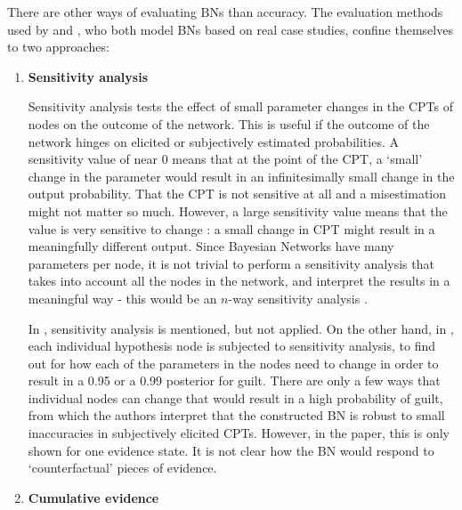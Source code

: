 \documentclass[12pt]{article}
\begin{document}
There are other ways of evaluating BNs than accuracy. The evaluation methods used by \citet{Fenton2019} and \citet{vlek2016}, who both model BNs based on real case studies, confine themselves to two approaches:

\begin{enumerate}

\item \textbf{Sensitivity analysis}

Sensitivity analysis tests the effect of small parameter changes in the CPTs of nodes on the outcome of the network. This is useful if the outcome of the network hinges on elicited or subjectively estimated probabilities. A sensitivity value of near 0 means that at the point of the CPT, a `small' change in the parameter would result in an infinitesimally small change in the output probability. That the CPT is not sensitive at all and a misestimation might not matter so much. However, a large sensitivity value means that the value is very sensitive to change : a small change in CPT might result in a meaningfully different output.  Since Bayesian Networks have many parameters per node, it is not trivial to perform a sensitivity analysis that takes into account all the nodes in the network, and interpret the results in a meaningful way - this would be an $n$-way sensitivity analysis \citep{gaag2007}.  

In \citet{vlek2016}, sensitivity analysis is mentioned, but not applied. On the other hand, in \citet{Fenton2019}, each individual hypothesis node is subjected to sensitivity analysis, to find out for how each of the parameters in the nodes need to change in order to result in a 0.95 or a 0.99 posterior for guilt. There are only a few ways that individual nodes can change that would result in a high probability of guilt, from which the authors interpret that the constructed BN is robust to small inaccuracies in subjectively elicited CPTs. However, in the paper, this is only shown for one evidence state. It is not clear how the BN would respond to `counterfactual' pieces of evidence.


\item \textbf{Cumulative evidence}


\end{enumerate}
\end{document}
